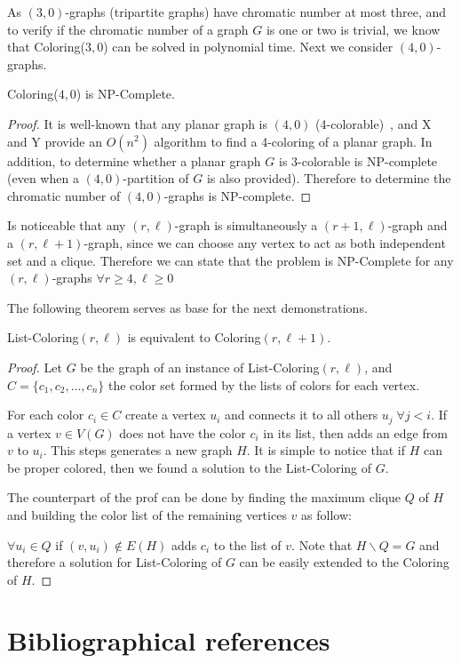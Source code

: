 \documentclass[9pt]{./document-types/entcs} \usepackage{./document-types/entcsmacro}
\begin{document}
As $(3,0)$-graphs (tripartite graphs) have chromatic number at most three, and to verify if the chromatic number of a graph $G$
is one or two is trivial, we know that {\sc Coloring($3,0$)} can be solved in polynomial time.
Next we consider $(4,0)$-graphs.

\begin{lemma}
{\sc Coloring($4,0$)} is NP-Complete.
\end{lemma}
\begin{proof}
It is well-known that any planar graph is $(4,0)$ (4-colorable)~\cite{appel77}, and X and Y provide an $O(n^2)$ algorithm to find a 4-coloring of a planar graph.
In addition, to determine whether a planar graph $G$ is 3-colorable is NP-complete~\cite{larry} (even when a $(4,0)$-partition of $G$ is also provided).
Therefore to determine the chromatic number of $(4,0)$-graphs is NP-complete.
\end{proof}

Is noticeable that any $(r,\ell)$-graph is simultaneously a $(r+1,\ell)$-graph and a $(r,\ell+1)$-graph, since we can choose any vertex to act as both independent set and a clique. Therefore we can state that the problem is NP-Complete for any $(r,\ell)$-graphs $\forall r \geq 4 , \ell \geq 0$

The following theorem serves as base for the next demonstrations.

\begin{theorem}
  {\sc List-Coloring$(r,\ell)$} is equivalent to {\sc Coloring$(r,\ell+1)$}.
\end{theorem}
\begin{proof}
    Let $G$ be the graph of an instance of {\sc List-Coloring$(r,\ell)$}, and $C=\{c_1,c_2,\ldots,c_n\}$ the color set formed by the lists of colors for each vertex.

    For each color $c_i \in C$ create a vertex $u_i$ and connects it to all others $u_j\; \forall j < i$. If a vertex $v \in V(G)$ does not have the color $c_i$ in its list, then adds an edge from $v$ to $u_i$. This steps generates a new graph $H$. It is simple to notice that if $H$ can be proper colored, then we found a solution to the {\sc List-Coloring} of $G$.

    The counterpart of the prof can be done by finding the maximum clique $Q$ of $H$ and building the color list of the remaining vertices $v$ as follow:

    $\forall u_i \in Q$ if $(v,u_i) \notin E(H)$ adds $c_i$ to the list of $v$. Note that $H\backslash Q = G$ and therefore a solution for {\sc List-Coloring} of $G$ can be easily extended to the {\sc Coloring} of $H$.
\end{proof}



\section{Bibliographical references}\label{references}

\begin{thebibliography}{10}\label{bibliography}

\end{thebibliography}
\end{document}
